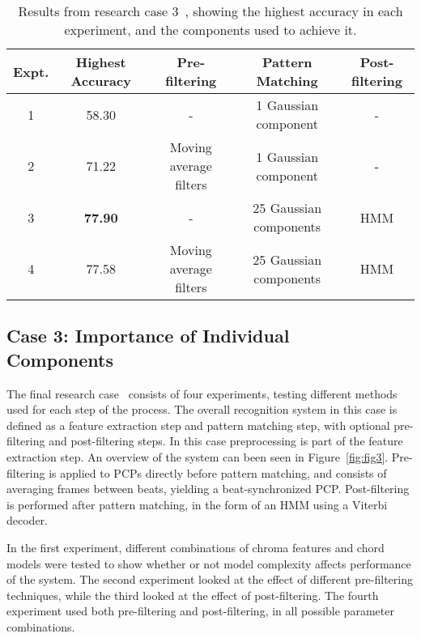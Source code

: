 \documentclass{sig-alternate}
\begin{document}
\begin{table*}
\centering
\begin{tabular}{|c|c|c|c|c|} \hline
\textbf{Expt.} & \textbf{Highest Accuracy} & \textbf{Pre-filtering} & \textbf{Pattern Matching} & \textbf{Post-filtering} \\ \hline
1 & 58.30 & - & 1 Gaussian component & - \\ \hline
2 & 71.22 & Moving average filters & 1 Gaussian component & - \\ \hline
3 & \textbf{77.90} & - & 25 Gaussian components & HMM \\ \hline
4 & 77.58 & Moving average filters & 25 Gaussian components & HMM \\ \hline

\end{tabular}
\caption{Results from research case 3~\cite{TaeMin:2014}, showing the highest accuracy in each experiment, and the components used to achieve it.}
\label{tab:tab9}
\end{table*}

\subsection{Case 3: Importance of Individual \\ Components}

The final research case~\cite{TaeMin:2014} consists of four experiments, testing different methods used for each step of the process. The overall recognition system in this case is defined as a feature extraction step and pattern matching step, with optional pre-filtering and post-filtering steps. In this case preprocessing is part of the feature extraction step. An overview of the system can been seen in Figure~\ref{fig:fig3}. Pre-filtering is applied to PCPs directly before pattern matching, and consists of averaging frames between beats, yielding a beat-synchronized PCP. Post-filtering is performed after pattern matching, in the form of an HMM using a Viterbi decoder.

In the first experiment, different combinations of chroma features and chord models were tested to show whether or not model complexity affects performance of the system. The second experiment looked at the effect of different pre-filtering techniques, while the third looked at the effect of post-filtering. The fourth experiment used both pre-filtering and post-filtering, in all possible parameter combinations. \\ \\ \\
\end{document}
